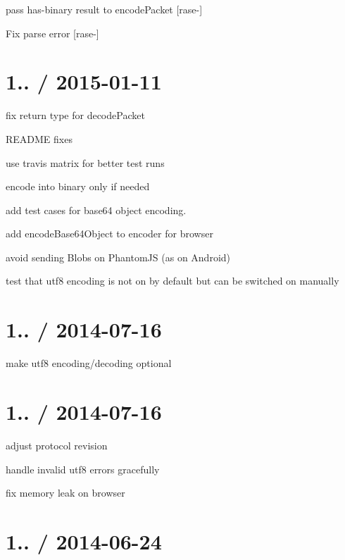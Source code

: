 \begin{DoxyItemize}
\item pass has-\/binary result to encode\+Packet \mbox{[}rase-\/\mbox{]}
\item Fix parse error \mbox{[}rase-\/\mbox{]}
\end{DoxyItemize}

\section*{1.. / 2015-\/01-\/11 }


\begin{DoxyItemize}
\item fix return type for decode\+Packet
\item R\+E\+A\+D\+ME fixes
\item use travis matrix for better test runs
\item encode into binary only if needed
\item add test cases for base64 object encoding.
\item add encode\+Base64\+Object to encoder for browser
\item avoid sending Blobs on Phantom\+JS (as on Android)
\item test that utf8 encoding is not on by default but can be switched on manually
\end{DoxyItemize}

\section*{1.. / 2014-\/07-\/16 }


\begin{DoxyItemize}
\item make utf8 encoding/decoding optional
\end{DoxyItemize}

\section*{1.. / 2014-\/07-\/16 }


\begin{DoxyItemize}
\item adjust protocol revision
\item handle invalid utf8 errors gracefully
\item fix memory leak on browser
\end{DoxyItemize}

\section*{1.. / 2014-\/06-\/24 }


